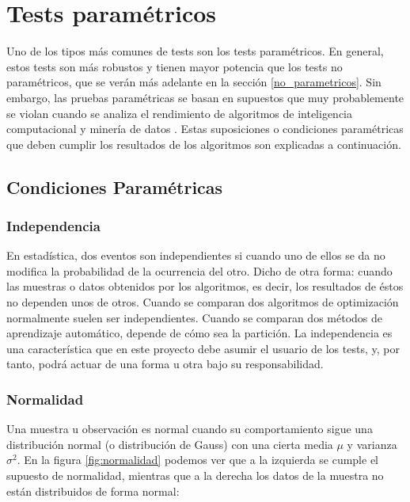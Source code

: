 
\section{Tests paramétricos}
Uno de los tipos más comunes de tests son los tests paramétricos. En general, estos tests son más robustos y
tienen mayor potencia que los tests no paramétricos, que se verán más adelante en la sección \ref{no_parametricos}.
Sin embargo, las pruebas paramétricas se basan en supuestos que muy probablemente se violan cuando se analiza el
rendimiento de algoritmos de inteligencia computacional y minería de datos \cite{parametricos}. Estas suposiciones
o condiciones paramétricas que deben cumplir los resultados de los algoritmos son explicadas a continuación.


\subsection{Condiciones Paramétricas}

\subsubsection{Independencia}
En estadística, dos eventos son independientes si cuando uno de ellos se da no modifica la probabilidad de la
ocurrencia del otro. Dicho de otra forma: cuando las muestras o datos obtenidos por los algoritmos, es decir, los
resultados de éstos no dependen unos de otros. Cuando se comparan dos algoritmos de optimización normalmente suelen
ser independientes. Cuando se comparan dos métodos de aprendizaje automático, depende de cómo sea la partición.
La independencia es una característica que en este proyecto debe asumir el usuario de los tests, y, por tanto,
podrá actuar de una forma u otra bajo su responsabilidad.

\subsubsection{Normalidad}
Una muestra u observación es normal cuando su comportamiento sigue una distribución normal (o distribución de
Gauss) con una cierta media $\mu$ y varianza $\sigma^2$. En la figura \ref{fig:normalidad} podemos ver que a la
izquierda se cumple el supuesto de normalidad, mientras que a la derecha los datos de la muestra no están distribuidos
de forma normal:

